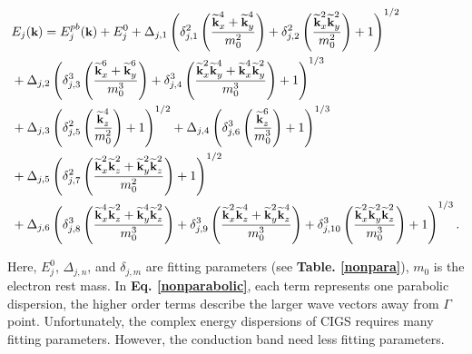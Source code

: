 \documentclass[a4paper, 12pt, titlepage,oneside,drop]{kthesis}
\begin{document}
\begin{equation}\label{nonparabolic}
\begin{split}
& \small E_j(\textbf{k}) = E_{j}^{pb}(\textbf{k}) + E_j^0 + \Delta_{j,1} \left( \delta_{j,1}^2 \left( \frac{\widetilde{\textbf{k}}_{x}^{4}+\widetilde{ \textbf{k}}_{y}^{4}}{m_{0}^{2}} \right) + \delta_{j,2}^2 \left( \frac{\widetilde{\textbf{k}}_{x}^{2}\widetilde{\textbf{k}}_{y}^{2}}{m_{0}^2} \right) + 1 \right)^{1/2} \\
& \small + \Delta_{j,2} \left( \delta_{j,3}^3 \left( \frac{\widetilde{\textbf{k}}_{x}^{6}+\widetilde{ \textbf{k}}_{y}^{6}}{m_{0}^{3}} \right) + \delta_{j,4}^3 \left( \frac{\widetilde{\textbf{k}}_{x}^{2}\widetilde{\textbf{k}}_{y}^{4} + \widetilde{\textbf{k}}_{x}^{4}\widetilde{\textbf{k}}_{y}^{2}}{m_{0}^3} \right) + 1 \right)^{1/3} \\
& \small + \Delta_{j,3} \left( \delta_{j,5}^2 \left( \frac{\widetilde{\textbf{k}}_{z}^{4}}{m_0^2} \right) + 1 \right)^{1/2} + \Delta_{j,4} \left( \delta_{j,6}^3 \left( \frac{\widetilde{\textbf{k}}_{z}^{6}}{m_0^3} \right) + 1 \right)^{1/3} \\
& \small + \Delta_{j,5} \left( \delta_{j,7}^2 \left( \frac{\widetilde{\textbf{k}}_{x}^{2}\widetilde{\textbf{k}}_{z}^{2} + \widetilde{\textbf{k}}_{y}^{2}\widetilde{\textbf{k}}_{z}^{2}}{m_{0}^2} \right) + 1 \right)^{1/2} \\
& \small + \Delta_{j,6} \left( \delta_{j,8}^3 \left( \frac{\widetilde{\textbf{k}}_{x}^{4}\widetilde{\textbf{k}}_{z}^{2} + \widetilde{\textbf{k}}_{y}^{4}\widetilde{\textbf{k}}_{z}^{2}}{m_{0}^3} \right) + \delta_{j,9}^3 \left( \frac{\widetilde{\textbf{k}}_{x}^{2}\widetilde{\textbf{k}}_{z}^{4} + \widetilde{\textbf{k}}_{y}^{2}\widetilde{\textbf{k}}_{z}^{4}}{m_{0}^3} \right) + \delta_{j,10}^3 \left( \frac{\widetilde{\textbf{k}}_{x}^{2}\widetilde{\textbf{k}}_{y}^{2}\widetilde{\textbf{k}}_{z}^{2}}{m_{0}^3} \right) +1 \right)^{1/3}.
\end{split}\end{equation}

Here,  $E_j^0$, $\Delta_{j,n}$, and $\delta_{j,m}$ are fitting parameters (see \textbf{Table. \ref{nonpara}}), ${m_0}$ is the electron rest mass. In \textbf{Eq. \ref{nonparabolic}}, each term represents one parabolic dispersion, the
higher order terms describe the larger wave vectors away from $\Gamma$ point. Unfortunately, the complex energy dispersions of CIGS requires many fitting parameters. However, the conduction band need less fitting parameters.
\end{document}
